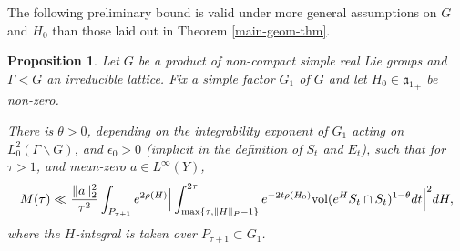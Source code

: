 \documentclass[12pt]{amsart}
\newtheorem{proposition}[theorem]{Proposition}
\theoremstyle{remark}
\newcommand{\ga}{\mathfrak a}
\begin{document}
The following preliminary bound is valid under more general assumptions on $G$ and $H_0$ than those laid out in Theorem \ref{main-geom-thm}.

\begin{proposition} \label{prop:main-term-bd}
Let $G$ be a product of non-compact simple real Lie groups and $\Gamma<G$ an irreducible lattice. Fix a simple factor $G_1$ of $G$ and let $H_0\in\overline{\ga_1}_+$ be non-zero. 

There is $\theta>0$, depending on the integrability exponent of $G_1$ acting on $L^2_0(\Gamma\backslash G)$, and $\epsilon_0>0$ (implicit in the definition of $S_t$ and $E_t$), such that for $\tau>1$, and mean-zero $a\in L^\infty(Y)$,
\[
M(\tau)\ll \frac{\|a\|_2^2}{\tau^2} \int_{P_{\tau +1}} e^{2 \rho( H)} \Big| \int_{\max\{\tau, \|H\|_P - 1\}}^{2\tau} e^{- 2 t\rho( H_0 )} \textnormal{vol}(e^HS_t \cap S_t)^{1-\theta}dt \Big|^2 dH,
\]
where the $H$-integral is taken over $P_{\tau+1}\subset G_1$.
\end{proposition}
\end{document}
